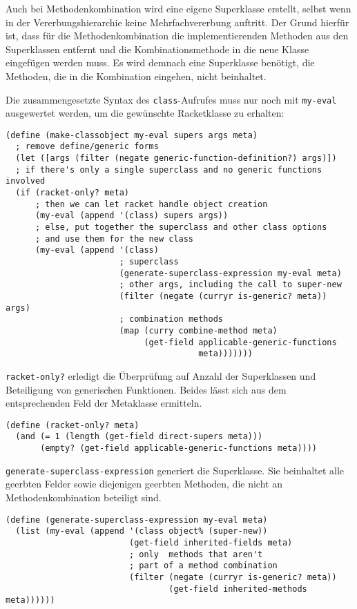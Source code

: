 Auch bei Methodenkombination wird eine eigene Superklasse erstellt, selbst wenn in der Vererbungshierarchie keine Mehrfachvererbung auftritt. Der Grund hierfür ist, dass  für die Methodenkombination die implementierenden Methoden aus den Superklassen entfernt und die Kombinationsmethode in die neue Klasse eingefügen werden muss. Es wird demnach eine Superklasse benötigt, die Methoden, die in die Kombination eingehen, nicht beinhaltet.

Die zusammengesetzte Syntax des \texttt{class}-Aufrufes muss nur noch mit \texttt{my-eval} ausgewertet werden, um die gewünschte Racketklasse zu erhalten:

\begin{lstlisting}
(define (make-classobject my-eval supers args meta)
  ; remove define/generic forms
  (let ([args (filter (negate generic-function-definition?) args)])
  ; if there's only a single superclass and no generic functions involved
  (if (racket-only? meta)
      ; then we can let racket handle object creation
      (my-eval (append '(class) supers args))
      ; else, put together the superclass and other class options
      ; and use them for the new class
      (my-eval (append '(class)
                       ; superclass
                       (generate-superclass-expression my-eval meta)
                       ; other args, including the call to super-new
                       (filter (negate (curryr is-generic? meta)) args)
                       ; combination methods
                       (map (curry combine-method meta)
                            (get-field applicable-generic-functions
                                       meta)))))))
\end{lstlisting}

\texttt{racket-only?} erledigt die Überprüfung auf Anzahl der Superklassen und Beteiligung von generischen Funktionen. Beides lässt sich aus dem entsprechenden Feld der Metaklasse ermitteln. 

\begin{lstlisting}
(define (racket-only? meta)
  (and (= 1 (length (get-field direct-supers meta)))
       (empty? (get-field applicable-generic-functions meta))))
\end{lstlisting}

\texttt{generate-superclass-expression} generiert die Superklasse. Sie beinhaltet alle geerbten Felder sowie diejenigen geerbten Methoden, die nicht an Methodenkombination beteiligt sind. 

\begin{lstlisting}
(define (generate-superclass-expression my-eval meta)
  (list (my-eval (append '(class object% (super-new))
                         (get-field inherited-fields meta)
                         ; only  methods that aren't
                         ; part of a method combination
                         (filter (negate (curryr is-generic? meta))
                                 (get-field inherited-methods meta))))))
\end{lstlisting}

